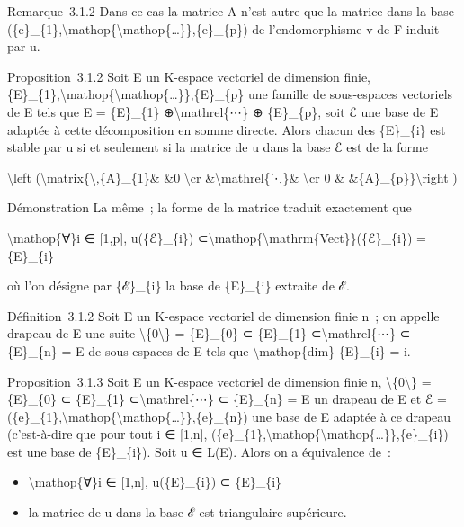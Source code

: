 \documentclass[]{article}
\begin{document}
Remarque~3.1.2 Dans ce cas la matrice A n'est autre que la matrice dans
la base
(\{e\}\_\{1\},\textbackslash{}mathop\{\textbackslash{}mathop\{\ldots{}\}\},\{e\}\_\{p\})
de l'endomorphisme v de F induit par u.

Proposition~3.1.2 Soit E un K-espace vectoriel de dimension finie,
\{E\}\_\{1\},\textbackslash{}mathop\{\textbackslash{}mathop\{\ldots{}\}\},\{E\}\_\{p\}
une famille de sous-espaces vectoriels de E tels que E = \{E\}\_\{1\}
⊕\textbackslash{}mathrel\{⋯\} ⊕ \{E\}\_\{p\}, soit ℰ une base de E
adaptée à cette décomposition en somme directe. Alors chacun des
\{E\}\_\{i\} est stable par u si et seulement si la matrice de u dans la
base ℰ est de la forme

\textbackslash{}left
(\textbackslash{}matrix\{\textbackslash{},\{A\}\_\{1\}\& \&0
\textbackslash{}cr \&\textbackslash{}mathrel\{⋱\}\& \textbackslash{}cr 0
\& \&\{A\}\_\{p\}\}\textbackslash{}right )

Démonstration La même~; la forme de la matrice traduit exactement que

\textbackslash{}mathop\{∀\}i ∈ {[}1,p{]}, u(\{ℰ\}\_\{i\})
⊂\textbackslash{}mathop\{\textbackslash{}mathrm\{Vect\}\}(\{ℰ\}\_\{i\})
= \{E\}\_\{i\}

où l'on désigne par \{ℰ\}\_\{i\} la base de \{E\}\_\{i\} extraite de ℰ.

Définition~3.1.2 Soit E un K-espace vectoriel de dimension finie n~; on
appelle drapeau de E une suite \textbackslash{}\{0\textbackslash{}\} =
\{E\}\_\{0\} ⊂ \{E\}\_\{1\} ⊂\textbackslash{}mathrel\{⋯\} ⊂ \{E\}\_\{n\}
= E de sous-espaces de E tels que \textbackslash{}mathop\{dim\}
\{E\}\_\{i\} = i.

Proposition~3.1.3 Soit E un K-espace vectoriel de dimension finie n,
\textbackslash{}\{0\textbackslash{}\} = \{E\}\_\{0\} ⊂ \{E\}\_\{1\}
⊂\textbackslash{}mathrel\{⋯\} ⊂ \{E\}\_\{n\} = E un drapeau de E et ℰ =
(\{e\}\_\{1\},\textbackslash{}mathop\{\textbackslash{}mathop\{\ldots{}\}\},\{e\}\_\{n\})
une base de E adaptée à ce drapeau (c'est-à-dire que pour tout i ∈
{[}1,n{]},
(\{e\}\_\{1\},\textbackslash{}mathop\{\textbackslash{}mathop\{\ldots{}\}\},\{e\}\_\{i\})
est une base de \{E\}\_\{i\}). Soit u ∈ L(E). Alors on a équivalence
de~:

\begin{itemize}
\itemsep1pt\parskip0pt
\item
  \textbackslash{}mathop\{∀\}i ∈ {[}1,n{]}, u(\{E\}\_\{i\}) ⊂
  \{E\}\_\{i\}
\item
  la matrice de u dans la base ℰ est triangulaire supérieure.
\end{itemize}
\end{document}

